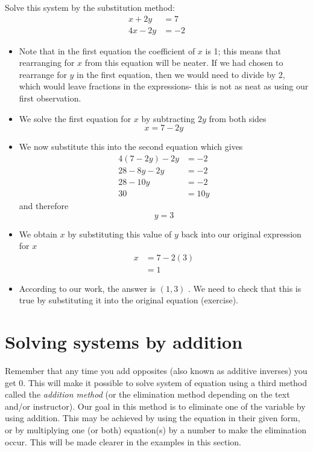 \begin{myexample}
Solve this system by the substitution method:
\begin{align*}
	x+2y  & =	7  \\
	4x-2y & =	-2 
\end{align*}
\end{myexample}
\begin{myProof}
	\begin{itemize}
		\item   Note that in the first equation the coefficient of $x$ is 1; this means that rearranging for $x$ from
		this equation will be neater. If we had chosen to rearrange for $y$ in the first equation, then
		we would need to divide by 2, which would leave fractions in the expressions- this is not as
		neat as using our first observation.
		\item   We solve the first equation for $x$ by subtracting $2 y$ from both sides
		\begin{equation*}
			x = 7-2y
		\end{equation*}
		\item   We now substitute this into the second equation which gives
		\begin{align*}
			4(7-2y)-2y & =		-2  \\
			28-8y-2y   & =		-2  \\
			28-10y     & =		-2  \\
			30         & =		10y 
		\end{align*}
		and therefore
		\begin{equation*}
			y=3
		\end{equation*}
		\item   We obtain $x$ by substituting this value of $y$ back into our original expression for $x$
		\begin{align*}
			x & =		7-2(3) \\
			  & =		1      
		\end{align*}
		\item According to our work, the answer is $(1,3)$ . We need to check that this is true by
		substituting it into the original equation (exercise).
	\end{itemize}
\end{myProof}
																											
\section{Solving systems by addition}
%
Remember that any time you add opposites (also known as additive inverses) you get 0. This will make it possible
to solve system of equation using a third method called the {\em addition method} (or the elimination method depending on the
text and/or instructor). Our goal in this method is to eliminate one of the variable by using addition. This may 
be achieved by using the equation in their given form, or by multiplying one (or both) equation(s) by a number to make
the elimination occur. This will be made clearer in the examples in this section.
																											
